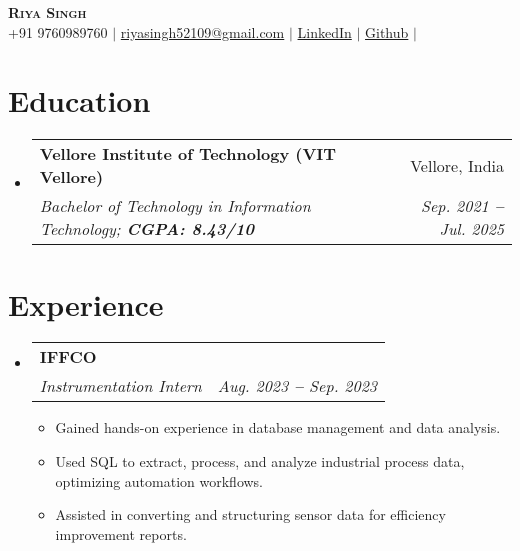 \documentclass[letterpaper,11pt]{article}
\makeatletter
\newcommand{\resumeItem}[1]{
  \item\small{
    {#1 \vspace{-2pt}}
  }
}
\newcommand{\resumeSubheading}[4]{
  \vspace{-2pt}\item
    \begin{tabular*}{0.97\textwidth}[t]{l@{\extracolsep{\fill}}r}
      \textbf{#1} & #2 \\
      \textit{\small#3} & \textit{\small #4} \\
    \end{tabular*}\vspace{-7pt}
}
\newcommand{\resumeSubHeadingListStart}{\begin{itemize}[leftmargin=0.15in, label={}]}
\newcommand{\resumeSubHeadingListEnd}{\end{itemize}}
\newcommand{\resumeItemListStart}{\begin{itemize}}
\newcommand{\resumeItemListEnd}{\end{itemize}\vspace{-5pt}}
\makeatother
\begin{document}

\begin{center}
    \textbf{\Huge \scshape Riya Singh} \\ \vspace{3pt}
    \small
    \faMobile \hspace{.5pt} {+91 9760989760}
    $|$
    \faAt \hspace{.5pt} \href{mailto:riyasingh52109@gmail.com}{riyasingh52109@gmail.com}
    $|$
    \faLinkedinSquare \hspace{.5pt} \href{https://www.linkedin.com/in/riya-singh-b27b48228}{LinkedIn}
    $|$
    \faGithub \hspace{.5pt} \href{https://github.com/RIYA-Singh21}{Github}
    $|$
    
\end{center}




\section{Education}
  \vspace{3pt}
  \resumeSubHeadingListStart

  
\resumeSubheading
{Vellore Institute of Technology (VIT Vellore)
}{Vellore, India}
{Bachelor of Technology in Information Technology;   \textbf{CGPA: 8.43/10}}{Sep. 2021 \textbf{--} Jul. 2025}


  \resumeSubHeadingListEnd



\section{Experience}
  \vspace{3pt}
  \resumeSubHeadingListStart

  
\resumeSubheading
      {IFFCO}{}
      {Instrumentation Intern}{Aug. 2023 \textbf{--} Sep. 2023}
      \resumeItemListStart
      \resumeItem{Gained hands-on experience in database management and data analysis.}\resumeItem{Used SQL to extract, process, and analyze industrial process data, optimizing automation workflows.}\resumeItem{Assisted in converting and structuring sensor data for efficiency improvement reports.}
        \resumeItemListEnd


  \resumeSubHeadingListEnd
\end{document}
